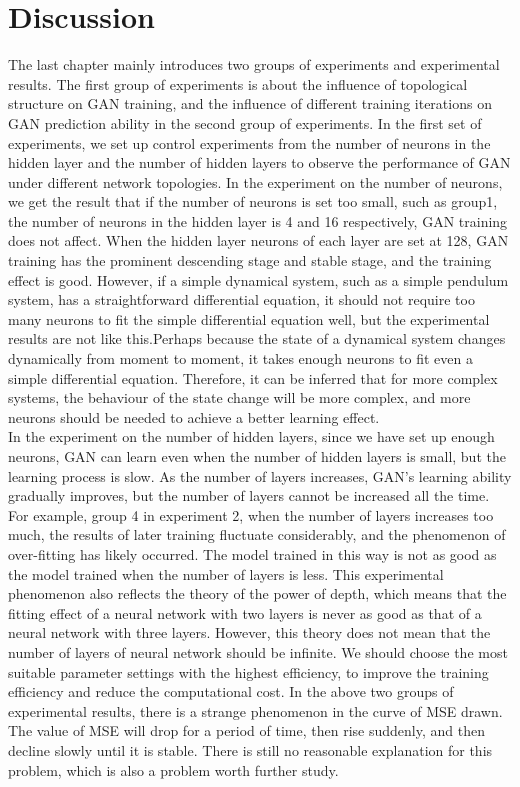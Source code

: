 \documentclass[11pt,a4paper]{article}
\begin{document}
\section{Discussion}
The last chapter mainly introduces two groups of experiments and experimental results. The first group of experiments is about the influence of topological structure on GAN training, and the influence of different training iterations on GAN prediction ability in the second group of experiments. In the first set of experiments, we set up control experiments from the number of neurons in the hidden layer and the number of hidden layers to observe the performance of GAN under different network topologies. In the experiment on the number of neurons, we get the result that if the number of neurons is set too small, such as group1, the number of neurons in the hidden layer is 4 and 16 respectively, GAN training does not affect. When the hidden layer neurons of each layer are set at 128, GAN training has the prominent descending stage and stable stage, and the training effect is good. However, if a simple dynamical system, such as a simple pendulum system, has a straightforward differential equation, it should not require too many neurons to fit the simple differential equation well, but the experimental results are not like this.Perhaps because the state of a dynamical system changes dynamically from moment to moment, it takes enough neurons to fit even a simple differential equation. Therefore, it can be inferred that for more complex systems, the behaviour of the state change will be more complex, and more neurons should be needed to achieve a better learning effect.
\\
\newline
In the experiment on the number of hidden layers, since we have set up enough neurons, GAN can learn even when the number of hidden layers is small, but the learning process is slow. As the number of layers increases, GAN's learning ability gradually improves, but the number of layers cannot be increased all the time. For example, group 4 in experiment 2, when the number of layers increases too much, the results of later training fluctuate considerably, and the phenomenon of over-fitting has likely occurred. The model trained in this way is not as good as the model trained when the number of layers is less. This experimental phenomenon also reflects the theory of the power of depth\citep{eldan2016power}, which means that the fitting effect of a neural network with two layers is never as good as that of a neural network with three layers. However, this theory does not mean that the number of layers of neural network should be infinite. We should choose the most suitable parameter settings with the highest efficiency, to improve the training efficiency and reduce the computational cost. In the above two groups of experimental results, there is a strange phenomenon in the curve of MSE drawn. The value of MSE will drop for a period of time, then rise suddenly, and then decline slowly until it is stable. There is still no reasonable explanation for this problem, which is also a problem worth further study.
\end{document}
